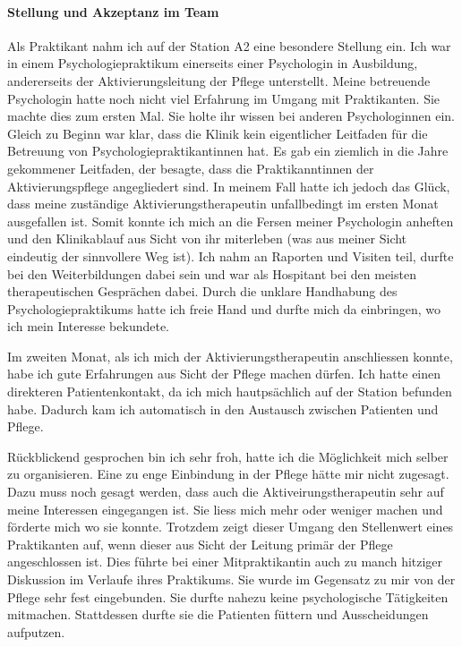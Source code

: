 \documentclass[jou,apacite]{apa6}
\begin{document}
\paragraph{Stellung und Akzeptanz im Team}
Als Praktikant nahm ich auf der Station A2 eine besondere Stellung ein. Ich war in einem Psychologiepraktikum einerseits einer Psychologin in Ausbildung, andererseits der Aktivierungsleitung der Pflege unterstellt. Meine betreuende Psychologin hatte noch nicht viel Erfahrung im Umgang mit Praktikanten. Sie machte dies zum ersten Mal. Sie holte ihr wissen bei anderen Psychologinnen ein. Gleich zu Beginn war klar, dass die Klinik kein eigentlicher Leitfaden für die Betreuung von Psychologiepraktikantinnen hat. Es gab ein ziemlich in die Jahre gekommener Leitfaden, der besagte, dass die Praktikanntinnen der Aktivierungspflege angegliedert sind. In meinem Fall hatte ich jedoch das Glück, dass meine zuständige Aktivierungstherapeutin unfallbedingt im ersten Monat ausgefallen ist. Somit konnte ich mich an die Fersen meiner Psychologin anheften und den Klinikablauf aus Sicht von ihr miterleben (was aus meiner Sicht eindeutig der sinnvollere Weg ist). Ich nahm an Raporten und Visiten teil, durfte bei den Weiterbildungen dabei sein und war als Hospitant bei den meisten therapeutischen Gesprächen dabei. Durch die unklare Handhabung des Psychologiepraktikums hatte ich freie Hand und durfte mich da einbringen, wo ich mein Interesse bekundete. 

Im zweiten Monat, als ich mich der Aktivierungstherapeutin anschliessen konnte, habe ich gute Erfahrungen aus Sicht der Pflege machen dürfen. Ich hatte einen direkteren Patientenkontakt, da ich mich hautpsächlich auf der Station befunden habe. Dadurch kam ich automatisch in den Austausch zwischen Patienten und Pflege. 

Rückblickend gesprochen bin ich sehr froh, hatte ich die Möglichkeit mich selber zu organisieren. Eine zu enge Einbindung in der Pflege hätte mir nicht zugesagt. Dazu muss noch gesagt werden, dass auch die Aktiveirungstherapeutin sehr auf meine Interessen eingegangen ist. Sie liess mich mehr oder weniger machen und förderte mich wo sie konnte. Trotzdem zeigt dieser Umgang den Stellenwert eines Praktikanten auf, wenn dieser aus Sicht der Leitung primär der Pflege angeschlossen ist. Dies führte bei einer Mitpraktikantin auch zu manch hitziger Diskussion im Verlaufe ihres Praktikums. Sie wurde im Gegensatz zu mir von der Pflege sehr fest eingebunden. Sie durfte nahezu keine psychologische Tätigkeiten mitmachen. Stattdessen durfte sie die Patienten füttern und Ausscheidungen aufputzen. 
\end{document}
